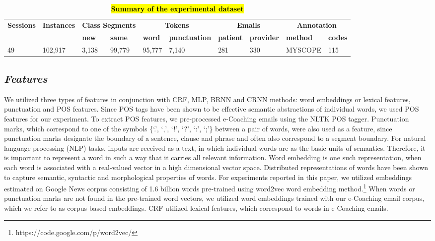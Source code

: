 \documentclass{amia}
\begin{document}
\begin{table}[ht]
\centering
\caption{\textbf{\hl{Summary of the experimental dataset}}}
\label{tab:datastat}
 \begin{tabular}{|l|l|l|l|l|l|l|l|l|l|}
  \hline
   \multirow{2}{*}{\textbf{Sessions}} & \multirow{2}{*}{\textbf{Instances}} & \multicolumn{2}{|c|}{\textbf{Class Segments}} & \multicolumn{2}{|c|}{\textbf{Tokens}} & \multicolumn{2}{|c|}{\textbf{Emails}} & \multicolumn{2}{|c|}{\textbf{Annotation}} \\\cline{3-10}
   &  & \textbf{new}  & \textbf{same} & \textbf{word} & \textbf{punctuation}  & \textbf{patient} & \textbf{provider} & \textbf{method}  & \textbf{codes} \\ \hline    
 49 & 102,917 & 3,138 & 99,779 & 95,777 & 7,140 & 281 & 330 & MYSCOPE & 115 \\ \hline
  \end{tabular}
\end{table}     

\subsection*{\textit{Features}}
We utilized three types of features in conjunction with CRF, MLP, BRNN and CRNN methods: word embeddings or lexical features, punctuation and POS features. Since POS tags have been shown to be effective semantic abstractions of individual words, we used POS features for our experiment.\cite{liu2005using,treviso2017sentence} To extract POS features, we pre-processed e-Coaching emails using the NLTK POS tagger. Punctuation marks, which correspond to one of the symbols \{`.', `,', `!', `?', `:', `;'\} between a pair of words, were also used as a feature, since punctuation marks designate the boundary of a sentence, clause and phrase and often also correspond to a segment boundary.\cite{cho2002text} For natural language processing (NLP) tasks, inputs are received as a text, in which individual words are as the basic units of semantics. Therefore, it is important to represent a word in such a way that it carries all relevant information. Word embedding is one such representation, when each word is associated with a real-valued vector in a high dimensional vector space. Distributed representations of words have been shown to capture semantic, syntactic and morphological properties of words.\cite{pennington2014glove, mikolov2013distributed} For experiments reported in this paper, we utilized embeddings estimated on Google News corpus consisting of 1.6 billion words pre-trained using word2vec word embedding method.\footnote{\label{fn:word2vec}https://code.google.com/p/word2vec/} When words or punctuation marks are not found in the pre-trained word vectors, we utilized word embeddings trained with our e-Coaching email corpus, which we refer to as corpus-based embeddings. CRF utilized lexical features, which correspond to words in e-Coaching emails. 
\end{document}
